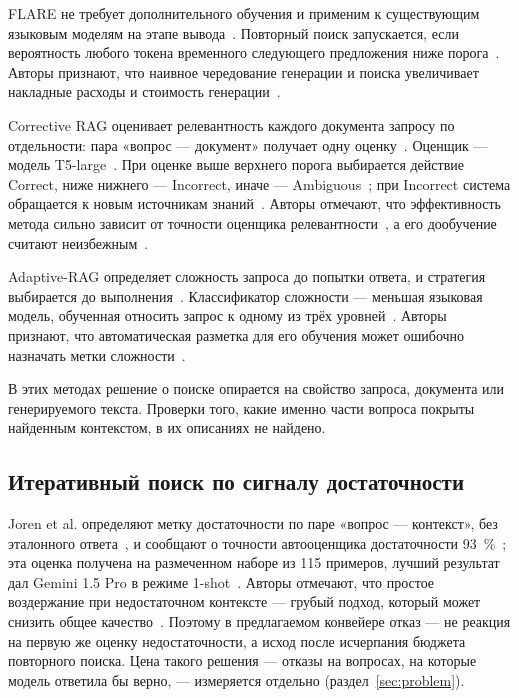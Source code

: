 \documentclass{misisarticle}
\begin{document}
FLARE не требует дополнительного обучения и применим к существующим языковым моделям на этапе вывода~\cite{jiang2023active}. %
Повторный поиск запускается, если вероятность любого токена временного следующего предложения ниже порога~\cite{jiang2023active}. %
Авторы признают, что наивное чередование генерации и поиска увеличивает накладные расходы и стоимость генерации~\cite{jiang2023active}. %

Corrective RAG оценивает релевантность каждого документа запросу по отдельности: пара «вопрос --- документ» получает одну оценку~\cite{yan2024corrective}. %
Оценщик --- модель T5-large~\cite{yan2024corrective}. %
При оценке выше верхнего порога выбирается действие Correct, ниже нижнего --- Incorrect, иначе --- Ambiguous~\cite{yan2024corrective}; %
при Incorrect система обращается к новым источникам знаний~\cite{yan2024corrective}. %
Авторы отмечают, что эффективность метода сильно зависит от точности оценщика релевантности~\cite{yan2024corrective}, %
а его дообучение считают неизбежным~\cite{yan2024corrective}. %

Adaptive-RAG определяет сложность запроса до попытки ответа, и стратегия выбирается до выполнения~\cite{jeong2024adaptive}. %
Классификатор сложности --- меньшая языковая модель, обученная относить запрос к одному из трёх уровней~\cite{jeong2024adaptive}. %
Авторы признают, что автоматическая разметка для его обучения может ошибочно назначать метки сложности~\cite{jeong2024adaptive}. %

В этих методах решение о поиске опирается на свойство запроса, документа или генерируемого текста.
Проверки того, какие именно части вопроса покрыты найденным контекстом, в их описаниях не найдено.

\subsection{Итеративный поиск по сигналу достаточности}

Joren et al. определяют метку достаточности по паре «вопрос --- контекст», без эталонного ответа~\cite{joren2024sufficient}, %
и сообщают о точности автооценщика достаточности 93~\%~\cite{joren2024sufficient}; %
эта оценка получена на размеченном наборе из 115 примеров, лучший результат дал Gemini 1.5 Pro в режиме 1-shot~\cite{joren2024sufficient}. %
Авторы отмечают, что простое воздержание при недостаточном контексте --- грубый подход, который может снизить общее качество~\cite{joren2024sufficient}. %
Поэтому в предлагаемом конвейере отказ --- не реакция на первую же оценку недостаточности, а исход после исчерпания бюджета повторного поиска.
Цена такого решения --- отказы на вопросах, на которые модель ответила бы верно, --- измеряется отдельно (раздел~\ref{sec:problem}).
\end{document}
